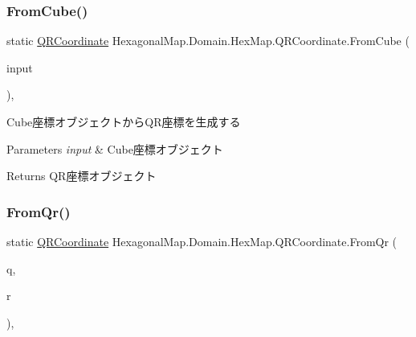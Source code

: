 \subsubsection{\texorpdfstring{From\+Cube()}{FromCube()}\hspace{0.1cm}{\footnotesize\ttfamily [2/2]}}
{\footnotesize\ttfamily static \mbox{\hyperlink{struct_hexagonal_map_1_1_domain_1_1_hex_map_1_1_q_r_coordinate}{Q\+R\+Coordinate}} Hexagonal\+Map.\+Domain.\+Hex\+Map.\+Q\+R\+Coordinate.\+From\+Cube (\begin{DoxyParamCaption}\item[{\mbox{\hyperlink{struct_hexagonal_map_1_1_domain_1_1_hex_map_1_1_cube_coordinate}{Cube\+Coordinate}}}]{input }\end{DoxyParamCaption})\hspace{0.3cm}{\ttfamily [inline]}, {\ttfamily [static]}}



Cube座標オブジェクトから\+Q\+R座標を生成する 


\begin{DoxyParams}{Parameters}
{\em input} & Cube座標オブジェクト\\
\hline
\end{DoxyParams}
\begin{DoxyReturn}{Returns}
Q\+R座標オブジェクト
\end{DoxyReturn}
\mbox{\label{struct_hexagonal_map_1_1_domain_1_1_hex_map_1_1_q_r_coordinate_a25a176d46902a8375cb037c2220a886d}} 
\subsubsection{\texorpdfstring{From\+Qr()}{FromQr()}}
{\footnotesize\ttfamily static \mbox{\hyperlink{struct_hexagonal_map_1_1_domain_1_1_hex_map_1_1_q_r_coordinate}{Q\+R\+Coordinate}} Hexagonal\+Map.\+Domain.\+Hex\+Map.\+Q\+R\+Coordinate.\+From\+Qr (\begin{DoxyParamCaption}\item[{int}]{q,  }\item[{int}]{r }\end{DoxyParamCaption})\hspace{0.3cm}{\ttfamily [inline]}, {\ttfamily [static]}}



